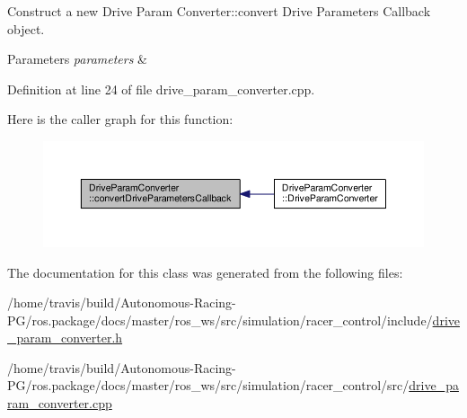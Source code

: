 Construct a new Drive Param Converter\+::convert Drive Parameters Callback object. 


\begin{DoxyParams}{Parameters}
{\em parameters} & \\
\hline
\end{DoxyParams}


Definition at line 24 of file drive\+\_\+param\+\_\+converter.\+cpp.



Here is the caller graph for this function\+:
\nopagebreak
\begin{figure}[H]
\begin{center}
\leavevmode
\includegraphics[width=350pt]{class_drive_param_converter_aa101cfe15a7358f7816f9d6a14fd4261_icgraph}
\end{center}
\end{figure}




The documentation for this class was generated from the following files\+:\begin{DoxyCompactItemize}
\item 
/home/travis/build/\+Autonomous-\/\+Racing-\/\+P\+G/ros.\+package/docs/master/ros\+\_\+ws/src/simulation/racer\+\_\+control/include/\hyperlink{drive__param__converter_8h}{drive\+\_\+param\+\_\+converter.\+h}\item 
/home/travis/build/\+Autonomous-\/\+Racing-\/\+P\+G/ros.\+package/docs/master/ros\+\_\+ws/src/simulation/racer\+\_\+control/src/\hyperlink{drive__param__converter_8cpp}{drive\+\_\+param\+\_\+converter.\+cpp}\end{DoxyCompactItemize}
